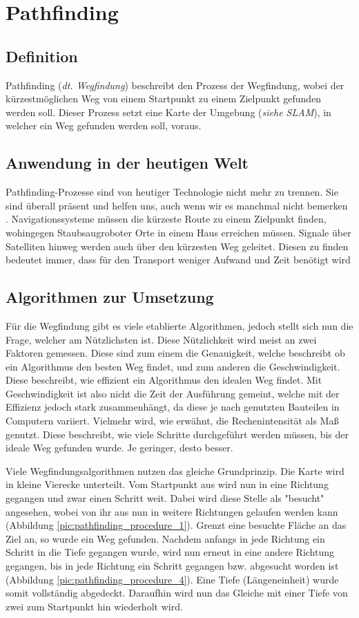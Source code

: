 \section{Pathfinding}
{
	\subsection{Definition}
	{
		Pathfinding (\textit{dt. Wegfindung}) beschreibt den Prozess der Wegfindung, wobei der kürzestmöglichen Weg von einem Startpunkt zu einem Zielpunkt gefunden werden soll. Dieser Prozess setzt eine Karte der Umgebung (\textit{siehe SLAM}), in welcher ein Weg gefunden werden soll, voraus.
	}

	\subsection{Anwendung in der heutigen Welt}
	{
		Pathfinding-Prozesse sind von heutiger Technologie nicht mehr zu trennen. Sie sind überall präsent und helfen uns, auch wenn wir es manchmal nicht bemerken . Navigationssysteme müssen die kürzeste Route zu einem Zielpunkt finden, wohingegen Staubsaugroboter Orte in einem Haus erreichen müssen. Signale über Satelliten hinweg werden auch über den kürzesten Weg geleitet. Diesen zu finden bedeutet immer, dass für den Transport weniger Aufwand und Zeit benötigt wird
	}

	\subsection{Algorithmen zur Umsetzung}
	{
		Für die Wegfindung gibt es viele etablierte Algorithmen, jedoch stellt sich nun die Frage, welcher am Nützlichsten ist. Diese Nützlichkeit wird meist an zwei Faktoren gemessen. Diese sind zum einem die Genauigkeit, welche beschreibt ob ein Algorithmus den besten Weg findet, und zum anderen die Geschwindigkeit. Diese beschreibt, wie effizient ein Algorithmus den idealen Weg findet. Mit Geschwindigkeit ist also nicht die Zeit der Ausführung gemeint, welche mit der Effizienz jedoch stark zusammenhängt, da diese je nach genutzten Bauteilen in Computern variiert. Vielmehr wird, wie erwähnt, die Rechenintensität als Maß genutzt. Diese beschreibt, wie viele Schritte durchgeführt werden müssen, bis der ideale Weg gefunden wurde. Je geringer, desto besser. 
		
		Viele Wegfindungsalgorithmen nutzen das gleiche Grundprinzip. Die Karte wird in kleine Vierecke unterteilt. Vom Startpunkt aus wird nun in eine Richtung gegangen und zwar einen Schritt weit. Dabei wird diese Stelle als "besucht" angesehen, wobei von ihr aus nun in weitere Richtungen gelaufen werden kann (Abbildung \ref{pic:pathfinding_procedure_1}). Grenzt eine besuchte Fläche an das Ziel an, so wurde ein Weg gefunden. Nachdem anfangs in jede Richtung ein Schritt in die Tiefe gegangen wurde, wird nun erneut in eine andere Richtung gegangen, bis in jede Richtung ein Schritt gegangen bzw. abgesucht worden ist (Abbildung \ref{pic:pathfinding_procedure_4}). Eine Tiefe (Längeneinheit) wurde somit vollständig abgedeckt. Daraufhin wird nun das Gleiche mit einer Tiefe von zwei zum Startpunkt hin wiederholt wird.
		
}}
